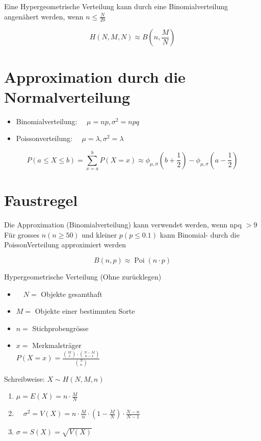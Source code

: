 \documentclass[10pt]{article}
\begin{document}
Eine Hypergeometrische Verteilung kann durch eine Binomialverteilung angenähert werden, wenn $n \leq \frac{N}{20}$

$$
H(N, M, N) \approx B\left(n, \frac{M}{N}\right)
$$

\section*{Approximation durch die Normalverteilung}
\begin{itemize}
  \item Binomialverteilung: $\quad \mu=n p, \sigma^{2}=n p q$
  \item Poissonverteilung: $\quad \mu=\lambda, \sigma^{2}=\lambda$
\end{itemize}

$$
P(a \leq X \leq b)=\sum_{x=a}^{b} P(X=x) \approx \phi_{\mu, \sigma}\left(b+\frac{1}{2}\right)-\phi_{\mu, \sigma}\left(a-\frac{1}{2}\right)
$$

\section*{Faustregel}
Die Approximation (Binomialverteilung) kann verwendet werden, wenn npq $>9$\\
Für grosses $n(n \geq 50)$ und kleiner $p(p \leq 0.1)$ kann Binomial- durch die PoissonVerteilung approximiert werden

$$
B(n, p) \approx \operatorname{Poi}(n \cdot p)
$$

Hypergeometrische Verteilung (Ohne zurücklegen)

\begin{itemize}
  \item $\quad N=$ Objekte gesamthaft
  \item $M=$ Objekte einer bestimmten Sorte
  \item $n=$ Stichprobengrösse
  \item $x=$ Merkmalsträger\\
$P(X=x)=\frac{\binom{M}{x} \cdot\binom{N-M}{n-x}}{\binom{N}{n}}$
\end{itemize}

Schreibweise: $X \sim H(N, M, n)$

\begin{enumerate}
  \item $\mu=E(X)=n \cdot \frac{M}{N}$
  \item $\quad \sigma^{2}=V(X)=n \cdot \frac{M}{n} \cdot\left(1-\frac{M}{N}\right) \cdot \frac{N-n}{N-1}$
  \item $\sigma=S(X)=\sqrt{V(X)}$
\end{enumerate}
\end{document}
